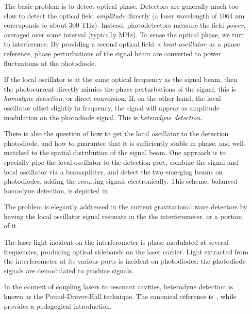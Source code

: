 \label{chapter3}
{}

The basic problem is to detect optical phase.  Detectors are generally
much too slow to detect the optical field \emph{amplitude} directly (a
laser wavelength of 1064 nm corresponds to about 300 THz).  Instead,
photodetectors measure the field \emph{power}, averaged over some
interval (typically MHz).  To sense the optical phase, we turn to
interference.  By providing a second optical field--a \emph{local
  oscillator}--as a phase reference, phase perturbations of the signal
beam are converted to power fluctuations at the photodiode.  

If the local oscillator is at the same optical frequency as the signal
beam, then the photocurrent directly mimics the phase perturbations of
the signal; this is \emph{homodyne detection}, or direct conversion.
If, on the other hand, the local oscillator offset slightly in
frequency, the signal will appear as amplitude modulation on the
photodiode signal.  This is \emph{heterodyne detection}.

There is also the question of how to get the local oscillator to the
detection photodiode, and how to guarantee that it is sufficiently
stable in phase, and well-matched to the spatial distribution of the
signal beam.  One approach is to specially pipe the local oscillator
to the detection port, combine the signal and local oscillator via a
beamsplitter, and detect the two emerging beams on photodiodes, adding
the resulting signals electronically.  This scheme, balanced homodyne
detection, is depicted in .

The problem is elegantly addressed in the current gravitational wave
detectors by having the local oscillator signal resonate in the the
interferometer, or a portion of it.


The laser light incident on the interferometer is phase-modulated at
several frequencies, producing optical sidebands on the laser carrier.
Light extracted from the interferometer at its various ports is
incident on photodiodes; the photodiode signals are demodulated to
produce signals.


In the context of coupling lasers to resonant cavities, heterodyne
detection is known as the Pound-Drever-Hall technique.  The canonical
reference is~\cite{Drever1983Laser}, while
\cite{Black2001Introduction} provides a pedagogical introduction.

